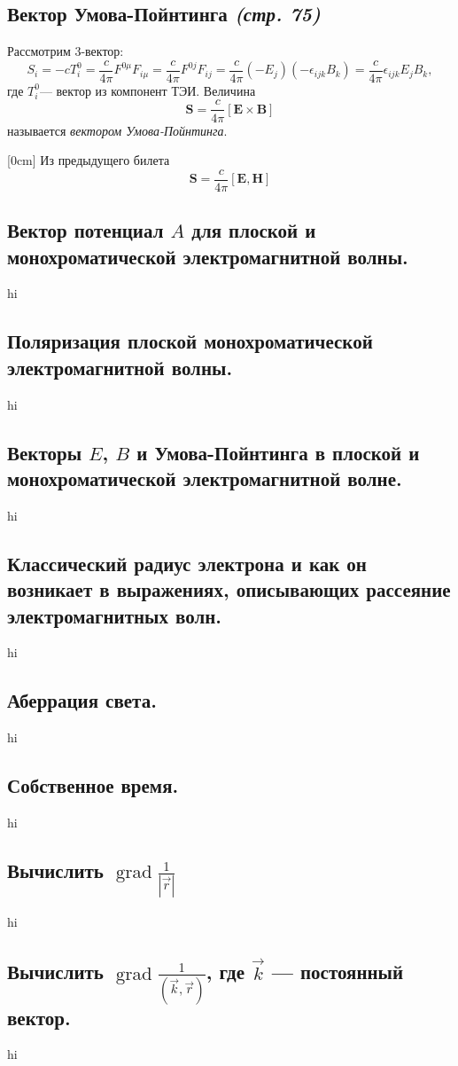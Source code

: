 \documentclass[a4paper,12pt]{article}
\begin{document}
\subsection{Вектор Умова-Пойнтинга \emph{(стр. 75)}}
Рассмотрим 3-вектор:
\[
S_i=-cT_i^0=\frac{c}{4\pi}F^{0\mu}F_{i\mu}=\frac{c}{4\pi}F^{0j}F_{ij}=
\frac{c}{4\pi}(-E_j)(-\epsilon_{ijk}B_k)=\frac{c}{4\pi}\epsilon_{ijk}E_j B_k
,\]
где $T_i^{0}$--- вектор из компонент ТЭИ.
Величина
\[
\mathbf{S}=\frac{c}{4\pi}\left[ \mathbf{E}\times\mathbf{B} \right] 
\]
называется \emph{вектором Умова-Пойнтинга}.

[0cm]
Из предыдущего билета \[\mathbf{S}=\frac{c}{4\pi}[\mathbf{E},\mathbf{H}]\]
\subsection{Вектор потенциал $A$ для плоской и монохроматической
электромагнитной
волны.}
hi
\subsection{Поляризация плоской монохроматической электромагнитной волны.}
hi
\subsection{Векторы $E$, $B$ и Умова-Пойнтинга в плоской и монохроматической
электромагнитной волне.}
hi
\subsection{Классический радиус электрона и как он возникает в выражениях,
описывающих рассеяние электромагнитных волн.}
hi
\subsection{Аберрация света.}
hi
\subsection{Собственное время.}
hi
\subsection{Вычислить $\operatorname{grad} \frac{1}{\left| \vec{r} \right| }$}
hi
\subsection{Вычислить $\operatorname{grad}
	\frac{1}{\left( \vec{k},\vec{r}\right)}
$, где $\vec{k}$ --- постоянный вектор.}
hi
\end{document}

